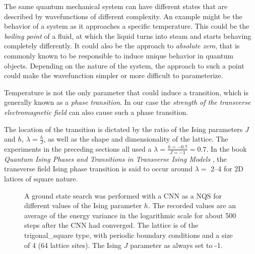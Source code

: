 The same quantum mechanical system can have different states that are described by wavefunctions of different complexity.
An example might be the behavior of a system as it approaches a specific temperature.
This could be the \emph{boiling point} of a fluid, at which the liquid turns into steam and starts behaving completely differently.
It could also be the approach to \emph{absolute zero}, that is commonly known to be responsible to induce unique behavior in quantum objects.
Depending on the nature of the system, the approach to such a point could make the wavefunction simpler or more difficult to parameterize.

Temperature is not the only parameter that could induce a transition, which is generally known as a \emph{phase transition}.
In our case the \emph{strength of the transverse electromagnetic field} can also cause such a phase transition.

The location of the transition is dictated by the ratio of the Ising parameters $J$ and $h$, $\lambda = \frac{h}{J}$, as well as the shape and dimensionality of the lattice.
The experiments in the preceding sections all used a $\lambda = \frac{h=-0.7}{J=-1} = 0.7$.
In the book \emph{Quantum Ising Phases and Transitions in Transverse Ising Models} \cite{isingBook}, the transverse field Ising phase transition is said to occur around $\lambda = $ \SIrange[]{2}{4}{} for 2D latices of square nature.

\begin{figure}[htbp]
    \centering
    \caption{
        A ground state search was performed with a CNN as a NQS for different values of the Ising parameter $h$.
        The recorded values are an average of the energy variance in the logarithmic scale for about 500 steps after the CNN had converged.
        The lattice is of the trigonal\_square type, with periodic boundary conditions and a size of 4 (64 lattice sites).
        The Ising $J$ parameter as always set to -1.
    }
    \label{fig:phase-transition}
\end{figure}

